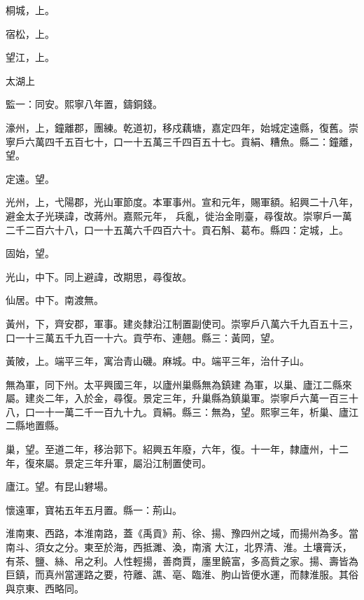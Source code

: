 \begin{pinyinscope}
 桐城，上。



 宿松，上。



 望江，上。



 太湖上



 監一：同安。熙寧八年置，鑄銅錢。



 濠州，上，鐘離郡，團練。乾道初，移戍藕塘，嘉定四年，始城定遠縣，復舊。崇寧戶六萬四千五百七十，口一十五萬三千四百五十七。貢絹、糟魚。縣二：鐘離，望。



 定遠。望。



 光州，上，弋陽郡，光山軍節度。本軍事州。宣和元年，賜軍額。紹興二十八年，避金太子光瑛諱，改蔣州。嘉熙元年，
 兵亂，徙治金剛臺，尋復故。崇寧戶一萬二千二百六十八，口一十五萬六千四百六十。貢石斛、葛布。縣四：定城，上。



 固始，望。



 光山，中下。同上避諱，改期思，尋復故。



 仙居。中下。南渡無。



 黃州，下，齊安郡，軍事。建炎隸沿江制置副使司。崇寧戶八萬六千九百五十三，口一十三萬五千九百一十六。貢苧布、連翹。縣三：黃岡，望。



 黃陂，上。端平三年，寓治青山磯。麻城。中。端平三年，治什子山。



 無為軍，同下州。太平興國三年，以廬州巢縣無為鎮建
 為軍，以巢、廬江二縣來屬。建炎二年，入於金，尋復。景定三年，升巢縣為鎮巢軍。崇寧戶六萬一百三十八，口一十一萬二千一百九十九。貢絹。縣三：無為，望。熙寧三年，析巢、廬江二縣地置縣。



 巢，望。至道二年，移治郭下。紹興五年廢，六年，復。十一年，隸廬州，十二年，復來屬。景定三年升軍，屬沿江制置使司。



 廬江。望。有昆山礬場。



 懷遠軍，寶祐五年五月置。縣一：荊山。



 淮南東、西路，本淮南路，蓋《禹貢》荊、徐、揚、豫四州之域，而揚州為多。當南斗、須女之分。東至於海，西抵濉、渙，南濱
 大江，北界清、淮。土壤膏沃，有茶、鹽、絲、帛之利。人性輕揚，善商賈，廛里饒富，多高貲之家。揚、壽皆為巨鎮，而真州當運路之要，符離、譙、亳、臨淮、朐山皆便水運，而隸淮服。其俗與京東、西略同。




\end{pinyinscope}
